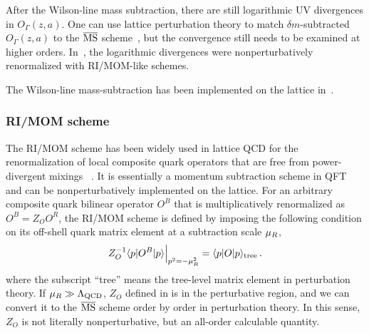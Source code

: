 After the Wilson-line mass subtraction, there are still logarithmic UV divergences in $O_\Gamma(z,a)$. One can use lattice perturbation theory to match $\delta m$-subtracted $O_\Gamma(z,a)$ to the ${\overline{\rm MS}}$ scheme~\cite{Ishikawa:2016znu,Xiong:2017jtn,Constantinou:2017sej}, but the convergence still needs to be examined at higher orders. In~\cite{Green:2017xeu,Green:2020xco}, the logarithmic divergences were nonperturbatively renormalized with RI/MOM-like schemes.

The Wilson-line mass-subtraction has been implemented on the lattice in~\cite{Musch:2010ka,Zhang:2017bzy,Green:2017xeu,Chen:2017gck,Alexandrou:2020qtt}.

\subsubsection{RI/MOM scheme}
\label{sec:renorm-npr-rimom}

The RI/MOM scheme has been widely used in lattice QCD for the renormalization of local composite quark operators that are free from power-divergent mixings ~\cite{Martinelli:1994ty}. It is essentially a momentum subtraction scheme in QFT and can be nonperturbatively implemented on the lattice. For an arbitrary composite quark bilinear operator $O^B$ that is multiplicatively renormalized as $O^B=Z_OO^R$, the RI/MOM scheme is defined by imposing the following condition on its off-shell quark matrix element at a subtraction scale $\mu_{\tiny R}$,
\begin{align} \label{eq:rimom}
	Z^{-1}_O \langle p|O^B|p\rangle \Big|_{p^2=-\mu_{\tiny R}^2}= \langle p|O|p\rangle_{\rm tree}\,.
\end{align}
where the subscript ``tree'' means the tree-level matrix element in perturbation theory. If $\mu_{\tiny R} \gg \Lambda_{\rm QCD}$, $Z_O$ defined in  is in the perturbative region, and we can convert it to the ${\overline{\rm MS}}$ scheme order by order in perturbation theory. In this sense, $Z_O$ is not literally nonperturbative, but an all-order calculable quantity.

